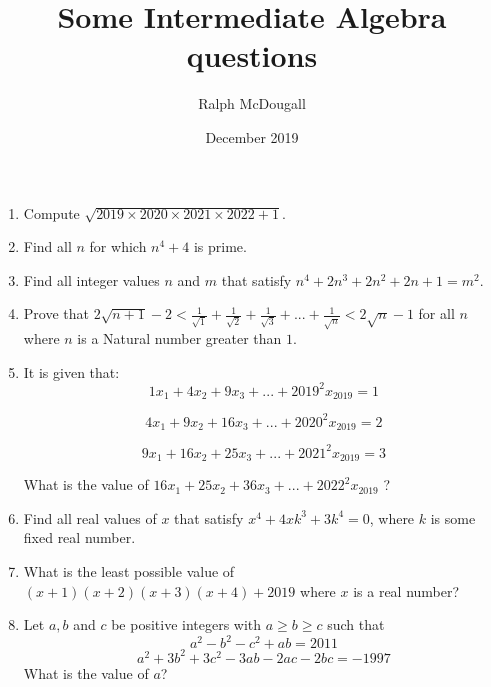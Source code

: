 \documentclass[a4paper,12pt]{article}
\begin{document}
\title {Some Intermediate Algebra questions}
\author{Ralph McDougall}
\date{December 2019}
\maketitle

\begin{enumerate}
\item %
Compute $\sqrt{2019 \times 2020 \times 2021 \times 2022 + 1}$. 

\item %
Find all $n$ for which $n^4 + 4$ is prime.

\item %
Find all integer values $n$ and $m$ that satisfy $n^4 + 2n^3 + 2n^2 + 2n + 1 = m^2$. 

\item %
Prove that $2\sqrt{n + 1} - 2 < \frac{1}{\sqrt{1}} + \frac{1}{\sqrt{2}} + \frac{1}{\sqrt{3}} + ... + \frac{1}{\sqrt{n}} < 2\sqrt{n} - 1$ for all $n$ where $n$ is a Natural number greater than $1$.

\item %
It is given that:
$$1x_1 + 4x_2 + 9x_3 + ... + 2019^2x_{2019} = 1$$

$$4x_1 + 9x_2 + 16x_3 + ... + 2020^2x_{2019} = 2$$

$$9x_1 + 16x_2 + 25x_3 + ... + 2021^2x_{2019} = 3$$

What is the value of $16x_1 + 25x_2 + 36x_3 + ... + 2022^2x_{2019}$ ?


\item %
Find all real values of $x$ that satisfy $x^4 + 4xk^3 + 3k^4 = 0$, where $k$ is some fixed real number.


\item %
What is the least possible value of $(x + 1)(x + 2)(x + 3)(x + 4) + 2019$ where $x$ is a real number?

\item %
Let $a, b$ and $c$ be positive integers with $a \ge b \ge c$ such that
$$a^2 - b^2 - c^2 + ab = 2011$$
$$a^2 + 3b^2 + 3c^2 - 3ab - 2ac - 2bc = -1997$$
What is the value of $a$?

\end{enumerate}
\end{document}
